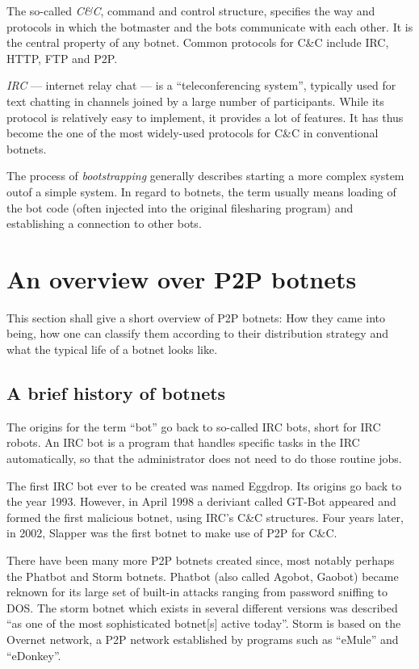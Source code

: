\documentclass{llncs}
\begin{document}
The so-called {\it C\&C}, command and control structure, specifies
the way and protocols in which the botmaster and the bots communicate
with each other. It is the central property of any botnet. Common
protocols for C\&C include IRC, HTTP, FTP and
P2P.\cite{borgaonkar2010analysis}

{\it IRC} --- internet relay chat --- is a ``teleconferencing
system''\cite{irc}, typically used for text chatting in channels
joined by a large number of participants. While its protocol is
relatively easy to implement, it provides a lot of features. It has
thus become the one of the most widely-used protocols for C\&C in
conventional botnets.

The process of {\it bootstrapping} generally describes starting a more
complex system outof a simple system. In regard to botnets, the
term usually means loading of the bot code (often injected into the
original filesharing program) and establishing a connection to other
bots.\cite{wang2009systematic}


\section{An overview over P2P botnets}
This section shall give a short overview of P2P botnets: How they came
into being, how one can classify them according to their distribution
strategy and what the typical life of a botnet looks like.

\subsection{A brief history of botnets}
The origins for the term ``bot'' go back to so-called IRC bots, short
for IRC robots. An IRC bot is a program that handles specific tasks in
the IRC automatically, so that the administrator does not need to do
those routine jobs.

The first IRC bot ever to be created was named Eggdrop. Its origins go
back to the year 1993. However, in April 1998 a deriviant called
GT-Bot appeared and formed the first malicious botnet, using IRC's
C\&C structures. Four years later, in 2002, Slapper was the first
botnet to make use of P2P for C\&C.\cite{li2009botnet}

There have been many more P2P botnets created since, most notably
perhaps the Phatbot and Storm botnets. Phatbot (also called Agobot,
Gaobot) became reknown for its large set of built-in attacks ranging
from password sniffing to DOS.\cite{cooke2005zombie} The storm botnet
which exists in several different versions was described ``as one of
the most sophisticated botnet[s] active
today''\cite{davis2008sybil}. Storm is based on the Overnet network, a
P2P network established by programs such as ``eMule'' and ``eDonkey''.
\end{document}
